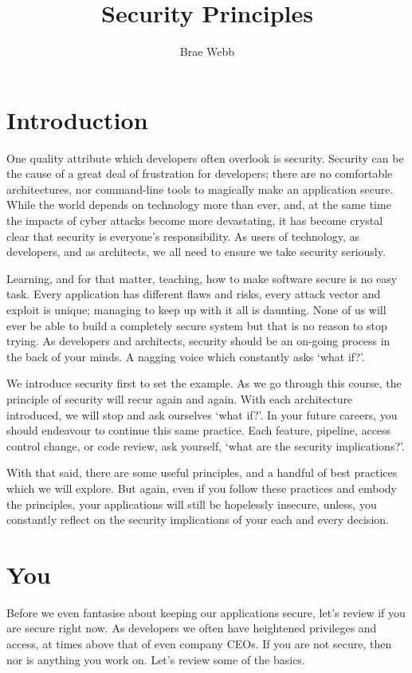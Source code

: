 \title{Security Principles}
\author{Brae Webb}
\date{}

\maketitle

\section{Introduction}

One quality attribute which developers often overlook is security.
Security can be the cause of a great deal of frustration for developers;
there are no comfortable architectures, nor command-line tools to magically make an application secure.
While the world depends on technology more than ever, and, at the same time the impacts of cyber attacks become more devastating,
it has become crystal clear that security is everyone's responsibility.
As users of technology, as developers, and as architects, we all need to ensure we take security seriously.

Learning, and for that matter, teaching, how to make software secure is no easy task.
Every application has different flaws and risks, every attack vector and exploit is unique; managing to keep up with it all is daunting.
None of us will ever be able to build a completely secure system but that is no reason to stop trying.
As developers and architects, security should be an on-going process in the back of your minds.
A nagging voice which constantly asks `what if?'.

We introduce security first to set the example.
As we go through this course, the principle of security will recur again and again.
With each architecture introduced, we will stop and ask ourselves `what if?'.
In your future careers, you should endeavour to continue this same practice.
Each feature, pipeline, access control change, or code review, ask yourself, `what are the security implications?'.

With that said, there are some useful principles, and a handful of best practices which we will explore.
But again, even if you follow these practices and embody the principles,
your applications will still be hopelessly insecure, unless,
you constantly reflect on the security implications of your each and every decision.

\section{You}
Before we even fantasise about keeping our applications secure, let's review if you are secure right now.
As developers we often have heightened privileges and access, at times above that of even company CEOs.
If you are not secure, then nor is anything you work on.
Let's review some of the basics.

